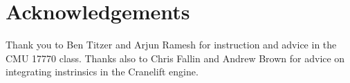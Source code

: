 \section*{Acknowledgements}

Thank you to Ben Titzer and Arjun Ramesh for instruction and advice in the CMU
17770 class.
%
Thanks also to Chris Fallin and Andrew Brown for advice on
integrating instrinsics in the Cranelift engine.

